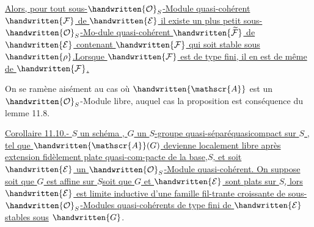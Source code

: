\uline{Alors, pour tout sous-$\handwritten{\mathcal{O}}_S$-Module quasi-cohérent $\handwritten{\mathcal{F}}$ de $\handwritten{\mathcal{E}}$ il existe un plus petit sous-$\handwritten{\mathcal{O}}_S$-Mo-\linebreak dule quasi-cohérent $\handwritten{\widetilde{\mathcal{F}}}$ de $\handwritten{\mathcal{E}}$ contenant $\handwritten{\mathcal{F}}$ qui soit stable sous $\handwritten{\rho}$.}\uline{Lorsque $\handwritten{\mathcal{F}}$ est de type  fini, il en est de même de $\handwritten{\mathcal{F}}$.}

On se ramène aisément au cas où $\handwritten{\mathscr{A}}$ est un $\handwritten{\mathcal{O}}_S$-Module libre, auquel cas la proposition est conséquence du lemme 11.8.

\uline{Corollaire 11.10.-  $S$ un  schéma , $G$ un $S$-groupe quasi-séparéquasicompact sur $S$ , tel que $\handwritten{\mathscr{A}}(G)$ devienne  localement libre après extension fidèlement plate quasi-com-\linebreak pacte de la base,$S$, et soit $\handwritten{\mathcal{E}}$ un $\handwritten{\mathcal{O}}_S$-Module quasi-cohérent. On suppose soit que $G$ est affine sur $S$\handwritten{,}soit que $G$ et $\handwritten{\mathcal{E}}$ sont plats sur $S$, lors $\handwritten{\mathcal{E}}$ est limite inductive d'une famille fil-\linebreak trante croissante de sous- $\handwritten{\mathcal{O}}_S$-Modules quasi-cohérents de type fini de $\handwritten{\mathcal{E}}$ stables sous} $\handwritten{G}$.

